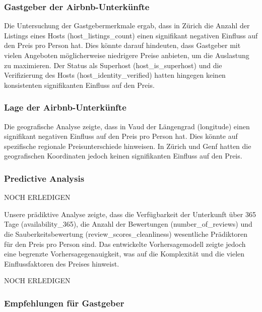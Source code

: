 \documentclass[
  journal,
]{IEEEtran}%
\begin{document}
\hypertarget{gastgeber-der-airbnb-unterkuxfcnfte}{%
\subsubsection{Gastgeber der
Airbnb-Unterkünfte}\label{gastgeber-der-airbnb-unterkuxfcnfte}}

Die Untersuchung der Gastgebermerkmale ergab, dass in Zürich die Anzahl
der Listings eines Hosts (host\_listings\_count) einen signifikant
negativen Einfluss auf den Preis pro Person hat. Dies könnte darauf
hindeuten, dass Gastgeber mit vielen Angeboten möglicherweise niedrigere
Preise anbieten, um die Auslastung zu maximieren. Der Status als
Superhost (host\_is\_superhost) und die Verifizierung des Hosts
(host\_identity\_verified) hatten hingegen keinen konsistenten
signifikanten Einfluss auf den Preis.

\hypertarget{lage-der-airbnb-unterkuxfcnfte}{%
\subsubsection{Lage der
Airbnb-Unterkünfte}\label{lage-der-airbnb-unterkuxfcnfte}}

Die geografische Analyse zeigte, dass in Vaud der Längengrad (longitude)
einen signifikant negativen Einfluss auf den Preis pro Person hat. Dies
könnte auf spezifische regionale Preisunterschiede hinweisen. In Zürich
und Genf hatten die geografischen Koordinaten jedoch keinen
signifikanten Einfluss auf den Preis.

\hypertarget{predictive-analysis-2}{%
\subsubsection{Predictive Analysis}\label{predictive-analysis-2}}

NOCH ERLEDIGEN

Unsere prädiktive Analyse zeigte, dass die Verfügbarkeit der Unterkunft
über 365 Tage (availability\_365), die Anzahl der Bewertungen
(number\_of\_reviews) und die Sauberkeitsbewertung
(review\_scores\_cleanliness) wesentliche Prädiktoren für den Preis pro
Person sind. Das entwickelte Vorhersagemodell zeigte jedoch eine
begrenzte Vorhersagegenauigkeit, was auf die Komplexität und die vielen
Einflussfaktoren des Preises hinweist.

NOCH ERLEDIGEN

\hypertarget{empfehlungen-fuxfcr-gastgeber}{%
\subsubsection{Empfehlungen für
Gastgeber}\label{empfehlungen-fuxfcr-gastgeber}}
\end{document}
